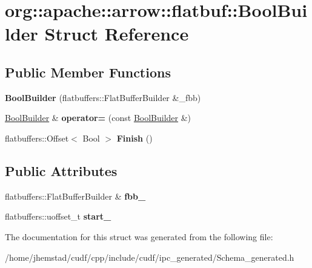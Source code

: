 \hypertarget{structorg_1_1apache_1_1arrow_1_1flatbuf_1_1BoolBuilder}{}\section{org\+:\+:apache\+:\+:arrow\+:\+:flatbuf\+:\+:Bool\+Builder Struct Reference}
\label{structorg_1_1apache_1_1arrow_1_1flatbuf_1_1BoolBuilder}
\subsection*{Public Member Functions}
\begin{DoxyCompactItemize}
\item 
{\bfseries Bool\+Builder} (flatbuffers\+::\+Flat\+Buffer\+Builder \&\+\_\+fbb)\hypertarget{structorg_1_1apache_1_1arrow_1_1flatbuf_1_1BoolBuilder_a4d22dbb3cf98dc5072a7760c7620b4b9}{}\label{structorg_1_1apache_1_1arrow_1_1flatbuf_1_1BoolBuilder_a4d22dbb3cf98dc5072a7760c7620b4b9}

\item 
\hyperlink{structorg_1_1apache_1_1arrow_1_1flatbuf_1_1BoolBuilder}{Bool\+Builder} \& {\bfseries operator=} (const \hyperlink{structorg_1_1apache_1_1arrow_1_1flatbuf_1_1BoolBuilder}{Bool\+Builder} \&)\hypertarget{structorg_1_1apache_1_1arrow_1_1flatbuf_1_1BoolBuilder_ae86a7809acc7d0eff00015a20ad0e529}{}\label{structorg_1_1apache_1_1arrow_1_1flatbuf_1_1BoolBuilder_ae86a7809acc7d0eff00015a20ad0e529}

\item 
flatbuffers\+::\+Offset$<$ Bool $>$ {\bfseries Finish} ()\hypertarget{structorg_1_1apache_1_1arrow_1_1flatbuf_1_1BoolBuilder_a759d38e7643ed57e6b332791befea671}{}\label{structorg_1_1apache_1_1arrow_1_1flatbuf_1_1BoolBuilder_a759d38e7643ed57e6b332791befea671}

\end{DoxyCompactItemize}
\subsection*{Public Attributes}
\begin{DoxyCompactItemize}
\item 
flatbuffers\+::\+Flat\+Buffer\+Builder \& {\bfseries fbb\+\_\+}\hypertarget{structorg_1_1apache_1_1arrow_1_1flatbuf_1_1BoolBuilder_adf4556ce6fb7766fa72f4c99fb0f7fdf}{}\label{structorg_1_1apache_1_1arrow_1_1flatbuf_1_1BoolBuilder_adf4556ce6fb7766fa72f4c99fb0f7fdf}

\item 
flatbuffers\+::uoffset\+\_\+t {\bfseries start\+\_\+}\hypertarget{structorg_1_1apache_1_1arrow_1_1flatbuf_1_1BoolBuilder_afc1902ad1b5617b29c7906aaf4832fd1}{}\label{structorg_1_1apache_1_1arrow_1_1flatbuf_1_1BoolBuilder_afc1902ad1b5617b29c7906aaf4832fd1}

\end{DoxyCompactItemize}


The documentation for this struct was generated from the following file\+:\begin{DoxyCompactItemize}
\item 
/home/jhemstad/cudf/cpp/include/cudf/ipc\+\_\+generated/Schema\+\_\+generated.\+h\end{DoxyCompactItemize}
